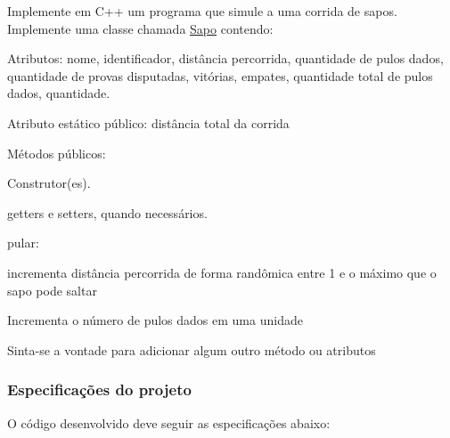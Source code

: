 Implemente em C++ um programa que simule a uma corrida de sapos. Implemente uma classe chamada \hyperlink{classSapo}{Sapo} contendo\+:


\begin{DoxyItemize}
\item Atributos\+: nome, identificador, distância percorrida, quantidade de pulos dados, quantidade de provas disputadas, vitórias, empates, quantidade total de pulos dados, quantidade.
\item Atributo estático público\+: distância total da corrida
\item Métodos públicos\+:
\begin{DoxyItemize}
\item Construtor(es).
\item getters e setters, quando necessários.
\item pular\+:
\begin{DoxyItemize}
\item incrementa distância percorrida de forma randômica entre 1 e o máximo que o sapo pode saltar
\item Incrementa o número de pulos dados em uma unidade
\end{DoxyItemize}
\end{DoxyItemize}
\item Sinta-\/se a vontade para adicionar algum outro método ou atributos
\end{DoxyItemize}

\subsubsection*{Especificações do projeto}

O código desenvolvido deve seguir as especificações abaixo\+:


